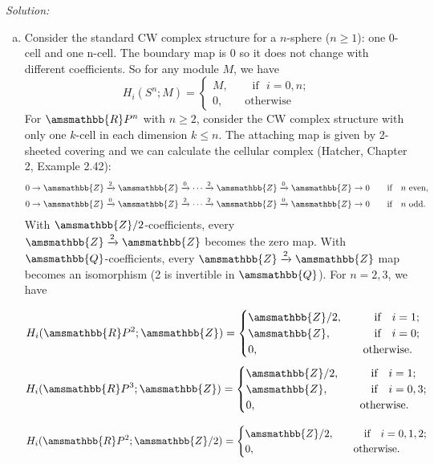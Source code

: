 \documentclass[a4paper, 12pt]{article}
\newenvironment{solution}
    {\textit{Solution:}}
    {}
\renewcommand{\mathbb}{\amsmathbb}
\newcommand{\iif}{\ \ \ \text{if}\ \ \ }
\begin{document}
\begin{solution}
\begin{enumerate}[(a)]
\item Consider the standard CW complex structure for a \(n\)-sphere (\(n\geq 1\)): one 0-cell and one n-cell. The boundary map is 0 so it does not change with different coefficients. So for any module \(M\), we have 
\[H_i(S^n;M)=\begin{cases}
	M,&\ \ \ \iif i=0,n;\\ 
	0,&\ \ \ \text{otherwise}
\end{cases}\] 
For \(\mathbb{R}P^n\) with \(n\geq 2\), consider the CW complex structure with only one \(k\)-cell in each dimension \(k\leq n\). The attaching map is given by 2-sheeted covering and we can calculate the cellular complex (Hatcher, Chapter 2, Example 2.42): 
\begin{align*}
	0\rightarrow \mathbb{Z}\xrightarrow{2} \mathbb{Z}\xrightarrow{0}\cdots\xrightarrow{2}\mathbb{Z}\xrightarrow{0}\mathbb{Z}\rightarrow 0 & \ \ \ \iif n\ \text{even},\\ 
	0\rightarrow \mathbb{Z}\xrightarrow{0} \mathbb{Z}\xrightarrow{2}\cdots\xrightarrow{2}\mathbb{Z}\xrightarrow{0}\mathbb{Z}\rightarrow 0 & \ \ \ \iif n\ \text{odd}.
\end{align*}
With \(\mathbb{Z}/2\)-coefficients, every \(\mathbb{Z}\xrightarrow{2}\mathbb{Z}\) becomes the zero map. With \(\mathbb{Q}\)-coefficients, every \(\mathbb{Z}\xrightarrow{2}\mathbb{Z}\) map becomes an isomorphism (2 is invertible in \(\mathbb{Q}\)). For \(n=2,3\), we have 
\begin{multicols}{2}
\noindent
	\[H_i(\mathbb{R}P^2;\mathbb{Z})=\begin{cases}
	\mathbb{Z}/2,&\ \ \ \iif i=1;\\ 
	\mathbb{Z},&\ \ \ \iif i=0;\\ 
	0,&\ \ \ \text{otherwise}.
\end{cases}\]
\[H_i(\mathbb{R}P^3;\mathbb{Z})=\begin{cases}
	\mathbb{Z}/2,&\ \ \ \iif i=1;\\ 
	\mathbb{Z},&\ \ \ \iif i=0,3;\\
	0,&\ \ \ \text{otherwise}.
\end{cases}\]
\end{multicols}
\begin{multicols}{2}
\noindent 
\[H_i(\mathbb{R}P^2;\mathbb{Z}/2)=\begin{cases}
	\mathbb{Z}/2,&\ \ \ \iif i=0,1,2;\\ 
	0,&\ \ \ \text{otherwise}.

\end{cases}\]
\end{multicols}
\end{enumerate}
\end{solution}
\end{document}
